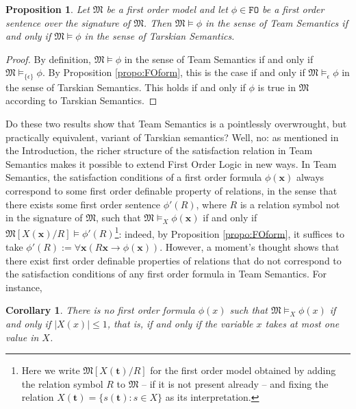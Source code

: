 \documentclass{article}
\newtheorem{Proposition}[Theorem]{Proposition}
\newtheorem{Corollary}[Theorem]{Corollary}
\theoremstyle{definition}
\newcommand{\tuple}{\mathbf}
\newcommand{\FO}{\texttt{FO}}
\newcommand{\M}{\mathfrak M}
\begin{document}
\begin{Proposition}
Let $\M$ be a first order model and let $\phi \in \FO$ be a first order sentence over the signature of $\M$. Then $\M \models \phi$ in the sense of Team Semantics if and only if $\M \models \phi$ in the sense of Tarskian Semantics. 
\label{propo:FOsent}
\end{Proposition}
\begin{proof}
By definition, $\M \models \phi$ in the sense of Team Semantics if and only if $\M \models_{\{\epsilon\}} \phi$. By Proposition \ref{propo:FOform}, this is the case if and only if $\M \models_\epsilon \phi$ in the sense of Tarskian Semantics. This holds if and only if $\phi$ is true in $\M$ according to Tarskian Semantics. 
\end{proof}
Do these two results show that Team Semantics is a pointlessly overwrought, but practically equivalent, variant of Tarskian semantics? Well, no: as mentioned in the Introduction, the richer structure of the satisfaction relation in Team Semantics makes it possible to extend First Order Logic in new ways. In Team Semantics, the satisfaction conditions of a first order formula $\phi(\tuple x)$ always correspond to some first order definable property of relations, in the sense that there exists some first order sentence $\phi'(R)$, where $R$ is a relation symbol not in the signature of $\M$, such that $\M \models_X \phi(\tuple x)$ if and only if $\M[X(\tuple x)/R] \models \phi'(R)$\footnote{Here we write $\M[X(\tuple t)/R]$ for the first order model obtained by adding the relation symbol $R$ to $\M$ -- if it is not present already -- and fixing the relation $X(\tuple t) = \{s(\tuple t) : s \in X\}$ as its interpretation.}: indeed, by Proposition \ref{propo:FOform}, it suffices to take $\phi'(R) := \forall \tuple x(R \tuple x \rightarrow \phi(\tuple x))$. However, a moment's thought shows that there exist first order definable properties of relations that do not correspond to the satisfaction conditions of any first order formula in Team Semantics. For instance,
\begin{Corollary}
There is no first order formula $\phi(x)$ such that $\M \models_X \phi(x)$ if and only if $|X(x)| \leq 1$, that is, if and only if the variable $x$ takes at most one value in $X$.
\label{coro:const}
\end{Corollary}
\end{document}

